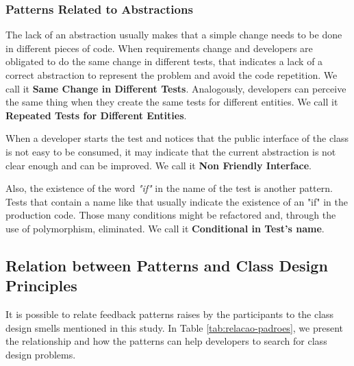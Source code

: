 \documentclass[times]{elsarticle}
\begin{document}
\subsubsection{Patterns Related to Abstractions}

The lack of an abstraction usually makes that a simple change needs to
be done in different pieces of code. When requirements change and
developers are obligated to do the same change in different tests,
that indicates a lack of a correct abstraction to represent the problem
and avoid the code repetition. We call it \textbf{Same Change in Different Tests}.
Analogously, developers can perceive the same thing when they create the
same tests for different entities. We call it \textbf{Repeated Tests for Different Entities}.

When a developer starts the test and notices that the public interface of the class
is not easy to be consumed, it may indicate that the current abstraction is not
clear enough and can be improved. We call it \textbf{Non Friendly Interface}.

Also, the existence of the word \textit{"if"} in the name of the test is another
pattern. Tests that contain a name like that usually indicate the existence
of an "if" in the production code. Those many conditions might be refactored and,
through the use of polymorphism, eliminated. We call it \textbf{Conditional in Test's name}.

\subsection{Relation between Patterns and Class Design Principles}

It is possible to relate feedback patterns raises by the participants to the class design
smells mentioned in this study.
In Table \ref{tab:relacao-padroes}, we present the relationship and how the patterns
can help developers to search for class design problems.
\end{document}
